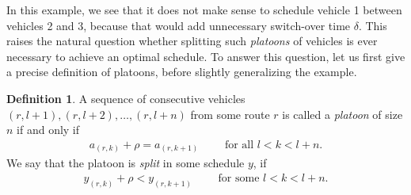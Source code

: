 \documentclass{report}
\theoremstyle{definition}
\newtheorem{define}{Definition}[chapter]
\theoremstyle{plain}
\begin{document}
In this example, we see that it does not make sense to schedule vehicle 1
between vehicles 2 and 3, because that would add unnecessary switch-over time
$\delta$. This raises the natural question whether splitting such \textit{platoons} of
vehicles is ever necessary to achieve an optimal schedule. To answer this
question, let us first give a precise definition of platoons, before slightly
generalizing the example.
%
\begin{define}
  A sequence of consecutive vehicles $(r, l+1), (r, l+2), \dots, (r, l+n)$ from
  some route $r$ is called a \textit{platoon} of size $n$ if and only if
  \begin{align}
  a_{(r,k)} + \rho = a_{(r, k+1)}  \quad \quad \text{ for all } l < k < l + n.
  \end{align}
 We say that the platoon is \textit{split}
  in some schedule $y$, if
  \begin{align}
  y_{(r, k)} + \rho < y_{(r, k + 1)} \quad \quad \text{ for some } l < k < l + n.
  \end{align}
\end{define}
%
\end{document}
